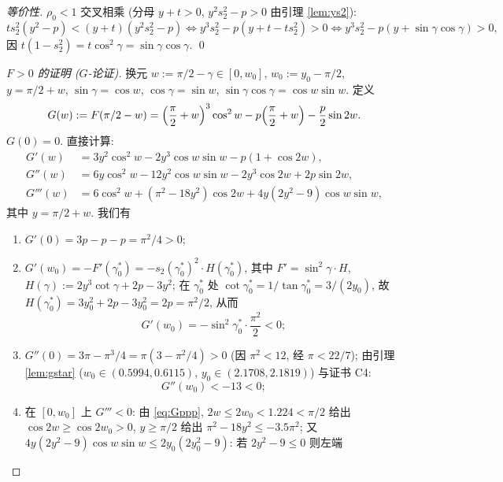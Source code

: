 \documentclass[UTF8]{ctexart}
\begin{document}
\begin{proof}[等价性]
$\rho_0<1$ 交叉相乘 (分母 $y+t>0$, $y^2s_2^2-p>0$ 由引理 \ref{lem:ys2}):
\begin{equation*}
	ts_2^2(y^2-p)<(y+t)(y^2s_2^2-p)
	\iff y^3s_2^2-p(y+t-ts_2^2)>0
	\iff y^3s_2^2-p(y+\sin\gamma\cos\gamma)>0,
\end{equation*}
因 $t(1-s_2^2)=t\cos^2\gamma=\sin\gamma\cos\gamma$. \qed

\emph{$F>0$ 的证明 ($G$-论证).} 换元 $w:=\pi/2-\gamma\in[0,w_0]$, $w_0:=y_0-\pi/2$,
$y=\pi/2+w$, $\sin\gamma=\cos w$, $\cos\gamma=\sin w$, $\sin\gamma\cos\gamma
=\cos w\sin w$. 定义
\begin{equation}
	G(w):=F(\pi/2-w)=\Bigl(\frac\pi2+w\Bigr)^3\cos^2w
	-p\Bigl(\frac\pi2+w\Bigr)-\frac p2\sin2w.
	\label{eq:G}
\end{equation}
$G(0)=0$. 直接计算:
\begin{align}
	G'(w)&=3y^2\cos^2w-2y^3\cos w\sin w-p(1+\cos2w),
	\label{eq:Gp}\\
	G''(w)&=6y\cos^2w-12y^2\cos w\sin w-2y^3\cos2w+2p\sin2w,
	\label{eq:Gpp}\\
	G'''(w)&=6\cos^2w+(\pi^2-18y^2)\cos2w+4y(2y^2-9)\cos w\sin w,
	\label{eq:Gppp}
\end{align}
其中 $y=\pi/2+w$. 我们有
\begin{enumerate}
	\item[\textbf{(a)}] $G'(0)=3p-p-p=\pi^2/4>0$;
	\item[\textbf{(b)}] $G'(w_0)=-F'(\gamma_0^*)=-s_2(\gamma_0^*)^2\cdot H(\gamma_0^*)$,
		其中 $F'=\sin^2\gamma\cdot H$, $H(\gamma):=2y^3\cot\gamma+2p-3y^2$;
		在 $\gamma_0^*$ 处 $\cot\gamma_0^*=1/\tan\gamma_0^*=3/(2y_0)$, 故
		$H(\gamma_0^*)=3y_0^2+2p-3y_0^2=2p=\pi^2/2$, 从而
		\begin{equation}
			G'(w_0)=-\sin^2\gamma_0^*\cdot\frac{\pi^2}{2}<0;
			\label{eq:Gpw0}
		\end{equation}
	\item[\textbf{(c)}] $G''(0)=3\pi-\pi^3/4=\pi(3-\pi^2/4)>0$ (因
		$\pi^2<12$, 经 $\pi<22/7$); 由引理 \ref{lem:gstar}
		($w_0\in(0.5994,0.6115)$, $y_0\in(2.1708,2.1819)$) 与证书 C4:
		\begin{equation}
			G''(w_0)<-13<0;
			\label{eq:Gppw0}
		\end{equation}
	\item[\textbf{(d)}] 在 $[0,w_0]$ 上 $G'''<0$: 由 \eqref{eq:Gppp},
		$2w\le2w_0<1.224<\pi/2$ 给出 $\cos2w\ge\cos2w_0>0$,
		$y\ge\pi/2$ 给出 $\pi^2-18y^2\le-3.5\pi^2$; 又
		$4y(2y^2-9)\cos w\sin w\le2y_0(2y_0^2-9)$: 若 $2y^2-9\le0$ 则左端

\end{enumerate}
\end{proof}
\end{document}
